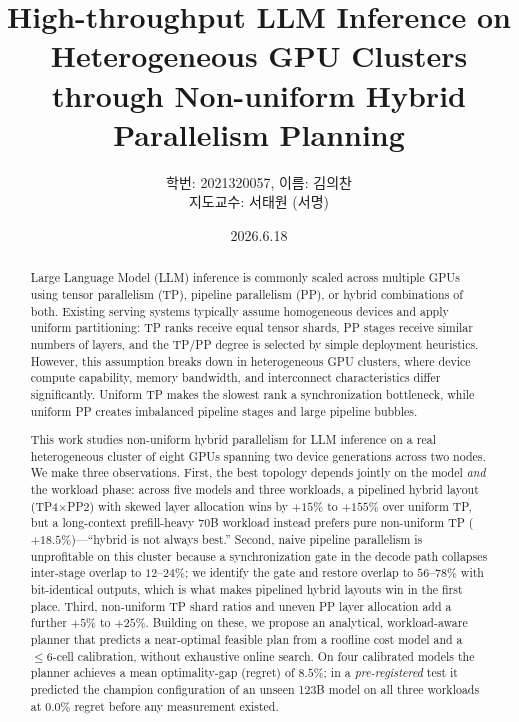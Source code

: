 \documentclass[twocolumn]{article}
\begin{document}
\title{High-throughput LLM Inference on Heterogeneous GPU Clusters through Non-uniform Hybrid Parallelism Planning}
\author{
학번: 2021320057, 이름: 김의찬 \\
지도교수: 서태원 (서명)}
\date{2026.6.18}
\maketitle

\begin{abstract}
Large Language Model (LLM) inference is commonly scaled across multiple GPUs using tensor parallelism (TP), pipeline parallelism (PP), or hybrid combinations of both. Existing serving systems typically assume homogeneous devices and apply uniform partitioning: TP ranks receive equal tensor shards, PP stages receive similar numbers of layers, and the TP/PP degree is selected by simple deployment heuristics. However, this assumption breaks down in heterogeneous GPU clusters, where device compute capability, memory bandwidth, and interconnect characteristics differ significantly. Uniform TP makes the slowest rank a synchronization bottleneck, while uniform PP creates imbalanced pipeline stages and large pipeline bubbles.

This work studies non-uniform hybrid parallelism for LLM inference on a real heterogeneous cluster of eight GPUs spanning two device generations across two nodes. We make three observations. First, the best topology depends jointly on the model \emph{and} the workload phase: across five models and three workloads, a pipelined hybrid layout (TP4$\times$PP2) with skewed layer allocation wins by $+15\%$ to $+155\%$ over uniform TP, but a long-context prefill-heavy 70B workload instead prefers pure non-uniform TP ($+18.5\%$)---``hybrid is not always best.'' Second, naive pipeline parallelism is unprofitable on this cluster because a synchronization gate in the decode path collapses inter-stage overlap to $12$--$24\%$; we identify the gate and restore overlap to $56$--$78\%$ with bit-identical outputs, which is what makes pipelined hybrid layouts win in the first place. Third, non-uniform TP shard ratios and uneven PP layer allocation add a further $+5\%$ to $+25\%$. Building on these, we propose an analytical, workload-aware planner that predicts a near-optimal feasible plan from a roofline cost model and a $\le 6$-cell calibration, without exhaustive online search. On four calibrated models the planner achieves a mean optimality-gap (regret) of $8.5\%$; in a \emph{pre-registered} test it predicted the champion configuration of an unseen 123B model on all three workloads at $0.0\%$ regret before any measurement existed.
\end{abstract}
\end{document}
